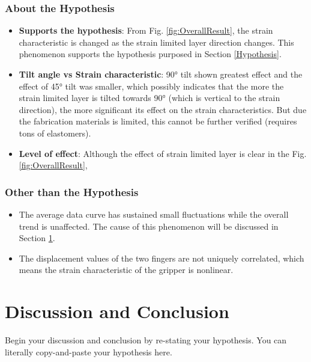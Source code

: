 \documentclass[conference]{IEEEtran}
\begin{document}
\subsubsection{About the Hypothesis}
\begin{itemize}
    \item \textbf{Supports the hypothesis}: From Fig. \ref{fig:OverallResult}, the strain characteristic is changed as the strain limited layer direction changes. This phenomenon supports the hypothesis purposed in Section \ref{Hypothesis}.
    \item \textbf{Tilt angle vs Strain characteristic}: 90° tilt shown greatest effect and the effect of 45° tilt was smaller, which possibly indicates that the more the strain limited layer is tilted towards 90° (which is vertical to the strain direction), the more significant its effect on the strain characteristics. But due the fabrication materials is limited, this cannot be further verified (requires tons of elastomers).
    \item \textbf{Level of effect}: Although the effect of strain limited layer is clear in the Fig. \ref{fig:OverallResult},  
\end{itemize}

\subsubsection{Other than the Hypothesis}

\begin{itemize}
    \item  The average data curve has sustained small fluctuations while the overall trend is unaffected. The cause of this phenomenon will be discussed in Section \ref{DiscussionAndConclusion}.
    \item The displacement values of the two fingers are not uniquely correlated, which means the strain characteristic of the gripper is nonlinear.
\end{itemize}


\section{Discussion and Conclusion}

\label{DiscussionAndConclusion}

Begin your discussion and conclusion by re-stating your hypothesis.  You can literally copy-and-paste your hypothesis here.  
\end{document}
